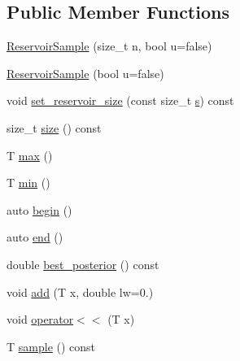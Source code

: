 \subsection*{Public Member Functions}
\begin{DoxyCompactItemize}
\item 
\hyperlink{class_fleet_1_1_statistics_1_1_reservoir_sample_a0dde0cb8cfbb14a0bbf8db7f4bb316e9}{Reservoir\+Sample} (size\+\_\+t n, bool u=false)
\item 
\hyperlink{class_fleet_1_1_statistics_1_1_reservoir_sample_a39c8b405654eaca4c943263a485bc015}{Reservoir\+Sample} (bool u=false)
\item 
void \hyperlink{class_fleet_1_1_statistics_1_1_reservoir_sample_adabe7f40c91657950a67df7d20ace543}{set\+\_\+reservoir\+\_\+size} (const size\+\_\+t \hyperlink{class_fleet_1_1_statistics_1_1_reservoir_sample_a7cf0266d882988e2a61b857d123c8b58}{s}) const
\item 
size\+\_\+t \hyperlink{class_fleet_1_1_statistics_1_1_reservoir_sample_abdfad455c8b8da8cb2ab30d0f60053e0}{size} () const
\item 
T \hyperlink{class_fleet_1_1_statistics_1_1_reservoir_sample_af2d03d8d0e93ddedc61a43d1827ae48d}{max} ()
\item 
T \hyperlink{class_fleet_1_1_statistics_1_1_reservoir_sample_ab2f186b828351e164e1ed6e60c8c9be8}{min} ()
\item 
auto \hyperlink{class_fleet_1_1_statistics_1_1_reservoir_sample_af441a020b7a7244e9ca56c8d293fb59a}{begin} ()
\item 
auto \hyperlink{class_fleet_1_1_statistics_1_1_reservoir_sample_a4e3cf1195fcb255f2b0281d9307bfd16}{end} ()
\item 
double \hyperlink{class_fleet_1_1_statistics_1_1_reservoir_sample_aa802a85955db2941b99851f3b98e5252}{best\+\_\+posterior} () const
\item 
void \hyperlink{class_fleet_1_1_statistics_1_1_reservoir_sample_a374930296f502c957a925a5f7ba9087b}{add} (T x, double lw=0.)
\item 
void \hyperlink{class_fleet_1_1_statistics_1_1_reservoir_sample_ad6e4d50ef1acefce7f5d66013720c1ef}{operator$<$$<$} (T x)
\item 
T \hyperlink{class_fleet_1_1_statistics_1_1_reservoir_sample_a1b66a8f27512ebd6a48370621a43db87}{sample} () const
\end{DoxyCompactItemize}
